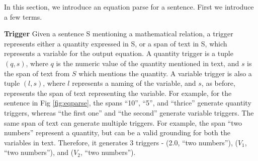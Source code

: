 \begin{figure*}
\begin{center}
\end{center}
\label{fig:eqparse}
\end{figure*}

  In this section, we introduce an equation parse for a
  sentence. First we introduce a few terms.

  \noindent \textbf{Trigger} Given a sentence S mentioning a
  mathematical relation, a trigger represents either a quantity
  expressed in S, or a span of text in S, which represents a variable
  for the output equation. A quantity trigger is a tuple $(q, s)$,
  where $q$ is the numeric value of the quantity mentioned in text,
  and $s$ is the span of text from $S$ which mentions the quantity. A
  variable trigger is also a tuple $(l, s)$, where $l$ represents a
  naming of the variable, and $s$, as before, represents the span of
  text representing the variable. For example, for the sentence in Fig
  \ref{fig:eqparse}, the spans ``10'', ``5'', and ``thrice'' generate
  quantity triggers, whereas ``the first one'' and ``the second''
  generate variable triggers. The same span of text can generate
  multiple triggers.  For example, the span ``two numbers'' represent
  a quantity, but can be a valid grounding for both the variables in
  text. Therefore, it generates $3$ triggers - (2.0, ``two numbers''), 
  ($V_1$, ``two numbers''), and ($V_2$, ``two numbers'').

